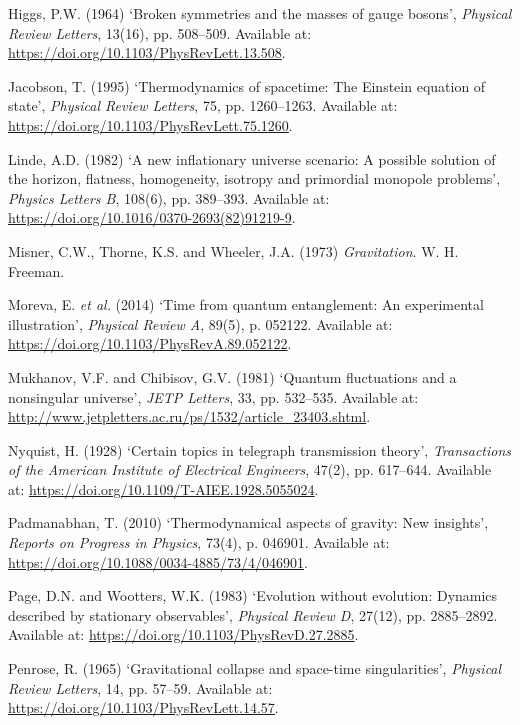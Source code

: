 \documentclass[
]{article}
\newlength{\cslhangindent}
\newenvironment{CSLReferences}[2] %
 {\begin{list}{}{%
  \setlength{\itemindent}{0pt}
  \setlength{\leftmargin}{0pt}
  \setlength{\parsep}{0pt}
  \ifodd #1
   \setlength{\leftmargin}{\cslhangindent}
   \setlength{\itemindent}{-1\cslhangindent}
  \fi
  \setlength{\itemsep}{#2\baselineskip}}}
 {\end{list}}
\begin{document}
\begin{CSLReferences}{0}{1}
Higgs, P.W. (1964) {`Broken symmetries and the masses of gauge bosons'},
\emph{Physical Review Letters}, 13(16), pp. 508--509. Available at:
\url{https://doi.org/10.1103/PhysRevLett.13.508}.

Jacobson, T. (1995) {`Thermodynamics of spacetime: The {Einstein}
equation of state'}, \emph{Physical Review Letters}, 75, pp. 1260--1263.
Available at: \url{https://doi.org/10.1103/PhysRevLett.75.1260}.

Linde, A.D. (1982) {`A new inflationary universe scenario: A possible
solution of the horizon, flatness, homogeneity, isotropy and primordial
monopole problems'}, \emph{Physics Letters B}, 108(6), pp. 389--393.
Available at: \url{https://doi.org/10.1016/0370-2693(82)91219-9}.

Misner, C.W., Thorne, K.S. and Wheeler, J.A. (1973) \emph{Gravitation}.
W. H. Freeman.

Moreva, E. \emph{et al.} (2014) {`Time from quantum entanglement: An
experimental illustration'}, \emph{Physical Review A}, 89(5), p. 052122.
Available at: \url{https://doi.org/10.1103/PhysRevA.89.052122}.

Mukhanov, V.F. and Chibisov, G.V. (1981) {`Quantum fluctuations and a
nonsingular universe'}, \emph{JETP Letters}, 33, pp. 532--535. Available
at: \url{http://www.jetpletters.ac.ru/ps/1532/article_23403.shtml}.

Nyquist, H. (1928) {`Certain topics in telegraph transmission theory'},
\emph{Transactions of the American Institute of Electrical Engineers},
47(2), pp. 617--644. Available at:
\url{https://doi.org/10.1109/T-AIEE.1928.5055024}.

Padmanabhan, T. (2010) {`Thermodynamical aspects of gravity: New
insights'}, \emph{Reports on Progress in Physics}, 73(4), p. 046901.
Available at: \url{https://doi.org/10.1088/0034-4885/73/4/046901}.

Page, D.N. and Wootters, W.K. (1983) {`Evolution without evolution:
Dynamics described by stationary observables'}, \emph{Physical Review
D}, 27(12), pp. 2885--2892. Available at:
\url{https://doi.org/10.1103/PhysRevD.27.2885}.

Penrose, R. (1965) {`Gravitational collapse and space-time
singularities'}, \emph{Physical Review Letters}, 14, pp. 57--59.
Available at: \url{https://doi.org/10.1103/PhysRevLett.14.57}.


\end{CSLReferences}
\end{document}
